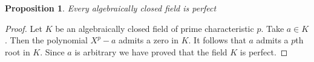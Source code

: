 \documentclass[12pt]{article}
\newtheorem{proposition}{Proposition}
\begin{document}
\begin{proposition} Every algebraically closed field is perfect \end{proposition}\begin{proof}
 Let $K$ be an algebraically closed field of prime characteristic $p$. Take $a\in K$. Then the polynomial $X^p-a$ admits a zero in $K$. It follows that $a$ admits a $p$th root in $K$. Since $a$ is arbitrary we have proved that the field $K$ is perfect.\end{proof}
\end{document}

